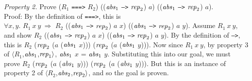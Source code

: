 \documentclass[envcountsame,runningheads]{llncs}
\begin{document}
{\it Property 2.} Prove
($R_1$ {\tt ===>} $R_2$)
((${\it abs}_1$ {\tt -->} ${\it rep}_2$) $a$)
((${\it abs}_1$ {\tt -->} ${\it rep}_2$) $a$). \\
Proof:
By the definition of {\tt ===>}, this is \\
$\forall x, y.$
$R_1 \ x \ y \ \Rightarrow$ $R_2$
((${\it abs}_1$ {\tt -->} ${\it rep}_2$) $a$ $x$)
((${\it abs}_1$ {\tt -->} ${\it rep}_2$) $a$ $y$). 
Assume $R_1 \ x \ y$, and show $R_2$
((${\it abs}_1$ {\tt -->} ${\it rep}_2$) $a$ $x$)
((${\it abs}_1$ {\tt -->} ${\it rep}_2$) $a$ $y$).
By the definition of {\tt -->}, this is $R_2$
(${\it rep}_2$ ($a$ (${\it abs}_1$ $x$)))
(${\it rep}_2$ ($a$ (${\it abs}_1$ $y$))).
Now since $R_1 \ x \ y$, by property 3 of $\langle R_1$,${\it abs}_1$,${\it rep}_1 \rangle$,
${\it abs}_1$ $x$ = ${\it abs}_1$ $y$.
Substituting this into our goal, we must prove $R_2$
(${\it rep}_2$ ($a$ (${\it abs}_1$ $y$)))
(${\it rep}_2$ ($a$ (${\it abs}_1$ $y$))).
But this is an instance of property 2 of
$\langle R_2$,${\it abs}_2$,${\it rep}_2 \rangle$, and
so the goal is proven.
\end{document}
